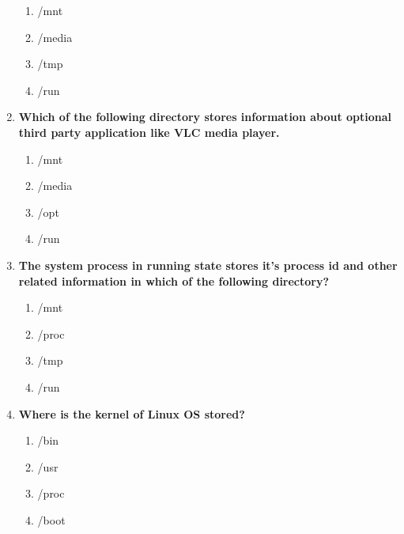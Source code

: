 \begin{flushleft}
\begin{enumerate}
		\begin{enumerate}[label=(\alph*)]
			\item /mnt
			\item /media  %
			\item /tmp
			\item /run
		\end{enumerate}
		\bigskip
		\bigskip
		\item \textbf{Which of the following directory stores information about optional third party application like VLC media player.}
		\begin{enumerate}[label=(\alph*)]
			\item /mnt
			\item /media
			\item /opt     %
			\item /run
		\end{enumerate}
		\bigskip
		\bigskip
		\item \textbf{The system process in running state stores it's process id and other related information in which of the following directory?}
		\begin{enumerate}[label=(\alph*)]
			\item /mnt
			\item /proc  %
			\item /tmp
			\item /run
		\end{enumerate}
			\bigskip
			\bigskip
		\item \textbf{Where is the kernel of Linux OS stored?}
		\begin{enumerate}[label=(\alph*)]
			\item /bin
			\item /usr
			\item /proc
			\item /boot    %
		\end{enumerate}  
	\end{enumerate}

	
\end{flushleft}
\newpage


